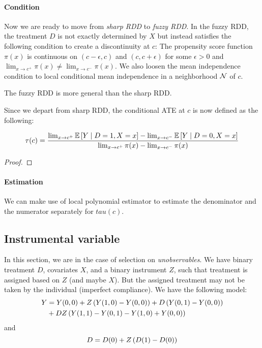 \paragraph{Condition} Now we are ready to move from \emph{sharp RDD} to \emph{fuzzy
    RDD}. In the fuzzy RDD, the treatment $D$ is not exactly determined by $X$ but
instead satisfies the following condition to create a discontinuity at $c$: The
propensity score function $\pi(x)$ is continuous on $(c-\epsilon,c)$ and
$(c,c+\epsilon)$ for some $\epsilon>0$ and $\lim_{x\to c^+}\pi(x)\neq
    \lim_{x\to c^-}\pi(x)$. We also loosen the mean independence condition to local
conditional mean independence in a neighborhood $\mathcal{N}$ of $c$.
\begin{remark}
    The fuzzy RDD is more general than the sharp RDD.
\end{remark}
Since we depart from sharp RDD, the conditional ATE at $c$ is now defined as the following:
\begin{proposition}\begin{equation*}
        \tau(c) = \frac{\lim_{x\to c^+}\mathbb{E}\left[Y\mid D=1,X=x\right]-\lim_{x\to c^-}\mathbb{E}\left[Y\mid D=0,X=x\right]}{\lim_{x\to c^+}\pi(x)-\lim_{x\to c^-}\pi(x)}
    \end{equation*}
\end{proposition}
\begin{proof}

\end{proof}
\paragraph{Estimation} We can make use of local polynomial estimator to estimate
the denominator and the numerator separately for $tau(c)$.

\subsection{Instrumental variable}

In this section, we are in the case of selection on \emph{unobservables}. We
have binary treatment $D$, covariates $X$, and a binary instrument $Z$, such
that treatment is assigned based on $Z$ (and maybe $X$). But the assigned
treatment may not be taken by the individual (imperfect compliance). We have
the following model:
\begin{equation}
    \begin{split}
        Y & = Y(0,0)+Z\left(Y(1,0)-Y(0,0)\right)+D\left(Y(0,1)-Y(0,0)\right) \\
        & + DZ\left(Y(1,1)-Y(0,1)-Y(1,0)+Y(0,0)\right)
    \end{split}
\end{equation}
and \begin{equation}
    D=D(0)+Z\left(D(1)-D(0)\right)
\end{equation}
